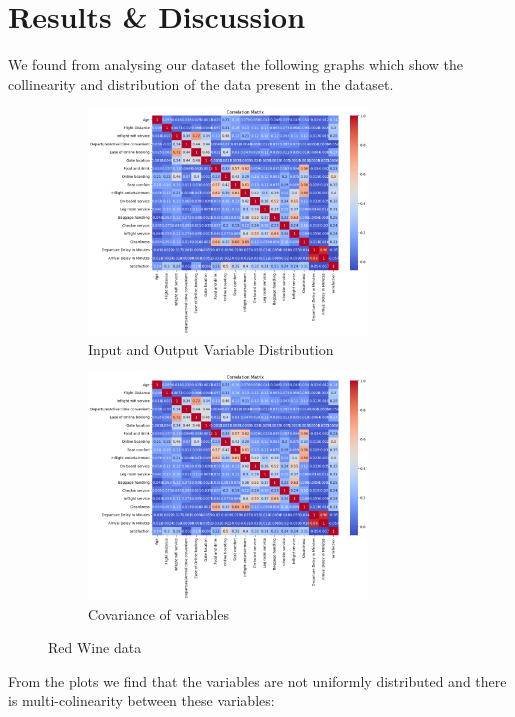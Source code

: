 \documentclass{article}
\begin{document}
\section{Results \& Discussion}
We found from analysing our dataset the following graphs which show the collinearity and distribution of the data present in the dataset.

\begin{figure}[h]

\begin{subfigure}{0.5\textwidth}
\includegraphics[width=0.9\linewidth, height=6cm]{1.png} 
\caption{Input and Output Variable Distribution}
\label{fig:subim1}
\end{subfigure}
\begin{subfigure}{0.5\textwidth}
\includegraphics[width=0.9\linewidth, height=6cm]{1.png}
\caption{Covariance of variables}
\label{fig:subim2}
\end{subfigure}

\caption{Red Wine data}
\label{fig:image2}
\end{figure}

From the plots we find that the variables are not uniformly distributed and there is multi-colinearity between these variables:
\end{document}
